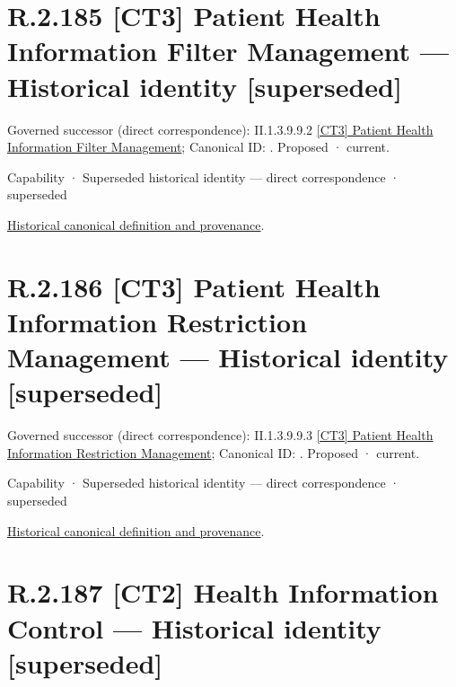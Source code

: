 \section*{R.2.185 [CT3] Patient Health Information Filter Management — Historical identity [superseded]}
\label{navigation:R.2.185}

{\small Governed successor (direct correspondence): II.1.3.9.9.2 \hyperref[element:62f673613c76494eba972cad3e4e8d0b]{[CT3] Patient Health Information Filter Management}; Canonical ID: \texttt{}. Proposed · current.}\par
\label{element:589f192797454d9e8960fb63774e5e9c}
{\small Capability · Superseded historical identity — direct correspondence · superseded}\par
\href{../../../../continuum/strategy/capability/589f192797454d9e8960fb63774e5e9c.md}{Historical canonical definition and provenance}.\par
\section*{R.2.186 [CT3] Patient Health Information Restriction Management — Historical identity [superseded]}
\label{navigation:R.2.186}

{\small Governed successor (direct correspondence): II.1.3.9.9.3 \hyperref[element:262366990bda4ac4ace5429269cf6a98]{[CT3] Patient Health Information Restriction Management}; Canonical ID: \texttt{}. Proposed · current.}\par
\label{element:5ad91d045474435a96b560e66ff7de05}
{\small Capability · Superseded historical identity — direct correspondence · superseded}\par
\href{../../../../continuum/strategy/capability/5ad91d045474435a96b560e66ff7de05.md}{Historical canonical definition and provenance}.\par
\section*{R.2.187 [CT2] Health Information Control — Historical identity [superseded]}
\label{navigation:R.2.187}

